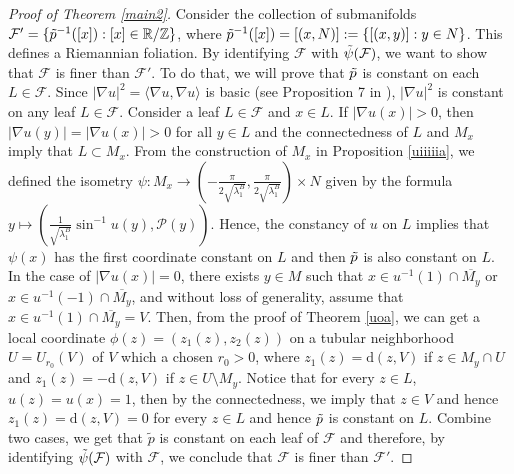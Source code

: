 \documentclass[11pt]{amsart}
\def\d{\mathrm{d}}
\begin{document}
\begin{proof}[Proof of Theorem \ref{main2}]
Consider the collection of submanifolds $\mathcal{F}'=\{\Tilde{p}^{-1}([x]): [x]\in \mathbb{R}/\mathbb{Z}\}$, where $\Tilde{p}^{-1}([x])=[(x,N)]:=\{[(x,y)]:y\in N\}$. This defines a Riemannian foliation. By identifying $\mathcal{F}$ with $\Tilde{\psi}(\mathcal{F})$, we want to show that $\mathcal{F}$ is finer than $\mathcal{F}'$. To do that, we will prove that $\Tilde{p}$ is constant on each $L\in\mathcal{F}$. Since $\vert \nabla u\vert^2=\langle \nabla u,\nabla u\rangle$ is basic (see Proposition 7 in \cite{ricardoradeschi}), $\vert \nabla u\vert^2$ is constant on any leaf $L\in \mathcal{F}$. Consider a leaf $L\in \mathcal{F}$ and $x\in L$. If $\vert\nabla u(x)\vert>0$, then $\vert \nabla u(y)\vert=\vert \nabla u(x)\vert>0$ for all $y\in L$ and the connectedness of $L$ and $M_x$ imply that $L\subset M_x$. From the construction of $M_x$ in Proposition \ref{uiiiiia}, we defined the isometry $\psi:M_x\to \left(-\frac{\pi}{2\sqrt{\lambda_1^B}},\frac{\pi}{2\sqrt{\lambda_1^B}}\right)\times N$ given by the formula $y\mapsto \left(\frac{1}{\sqrt{\lambda_1^B}}\sin^{-1}u(y),\mathcal{P}(y)\right)$. Hence, the constancy of $u$ on $L$ implies that $\psi(x)$ has the first coordinate constant on $L$ and then $\Tilde{p}$ is also constant on $L$. In the case of $\vert\nabla u(x)\vert=0$, there exists $y\in M$ such that $x\in u^{-1}(1)\cap \overline{M_y}$ or $x\in u^{-1}(-1)\cap\overline{M_y}$, and without loss of generality, assume that $x\in u^{-1}(1)\cap\overline{M_y}=V$. Then, from the proof of Theorem \ref{uoa}, we can get a local coordinate $\phi(z)=(z_1(z),z_2(z))$ on a tubular neighborhood $U=U_{r_0}(V)$ of $V$ which a chosen $r_0>0$, where 
$z_1(z)=\d(z,V)$ if $z\in M_y\cap U$ and $z_1(z)=-\d(z,V)$ if $z\in U\setminus M_y$. Notice that for every $z\in L$, $u(z)=u(x)=1$, then by the connectedness, we imply that $z\in V$ and hence $z_1(z)=\d(z,V)=0$ for every $z\in L$ and hence $\Tilde{p}$ is constant on $L$. Combine two cases, we get that $\tilde{p}$ is constant on each leaf of $\mathcal{F}$ and therefore, by identifying $\Tilde{\psi}(\mathcal{F})$ with $\mathcal{F}$, we conclude that $\mathcal{F}$ is finer than $\mathcal{F}'$.






\end{proof}
\end{document}
